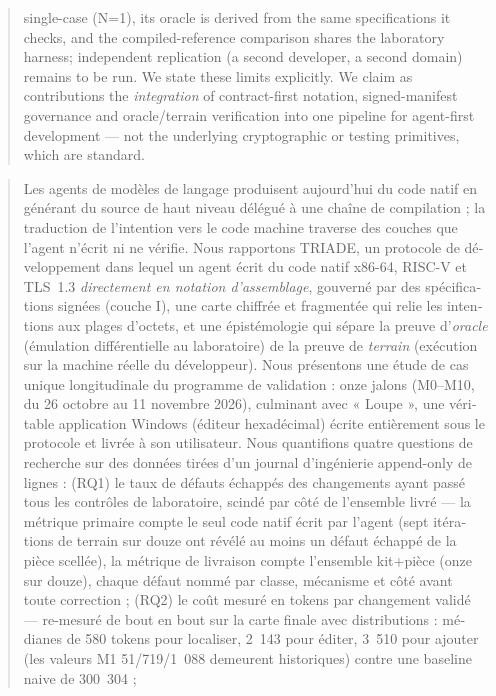 \documentclass[11pt,a4paper]{article}
\begin{document}
\begin{abstract}
single-case (N=1), its oracle is derived from the same specifications it
checks, and the compiled-reference comparison shares the laboratory
harness; independent replication (a second developer, a second domain)
remains to be run. We state these limits explicitly. We claim as contributions the \emph{integration}
of contract-first notation, signed-manifest governance and oracle/terrain
verification into one pipeline for agent-first development --- not the
underlying cryptographic or testing primitives, which are standard.
\end{abstract}

\begin{otherlanguage}{french}
\begin{abstract}
\noindent Les agents de modèles de langage produisent aujourd'hui du code
natif en générant du source de haut niveau délégué à une chaîne de
compilation ; la traduction de l'intention vers le code machine traverse
des couches que l'agent n'écrit ni ne vérifie. Nous rapportons TRIADE, un
protocole de développement dans lequel un agent écrit du code natif
x86-64, RISC-V et TLS~1.3 \emph{directement en notation d'assemblage},
gouverné par des spécifications signées (couche I), une carte chiffrée et
fragmentée qui relie les intentions aux plages d'octets, et une
épistémologie qui sépare la preuve d'\emph{oracle} (émulation
différentielle au laboratoire) de la preuve de \emph{terrain} (exécution
sur la machine réelle du développeur). Nous présentons une étude de cas
unique longitudinale du programme de validation : onze jalons (M0--M10, du
26 octobre au 11 novembre 2026), culminant avec « Loupe », une véritable
application Windows (éditeur hexadécimal) écrite entièrement sous le
protocole et livrée à son utilisateur. Nous quantifions quatre questions
de recherche sur des données tirées d'un journal d'ingénierie append-only
de \nbLignesJournal{} lignes : (RQ1) le taux de défauts échappés des changements ayant
passé tous les contrôles de laboratoire, scindé par côté de l'ensemble
livré — la métrique primaire compte le seul code natif écrit par
l'agent (sept itérations de terrain sur douze ont révélé au moins un
défaut échappé de la pièce scellée), la métrique de livraison compte
l'ensemble kit+pièce (onze sur douze), chaque défaut nommé par classe,
mécanisme et côté avant toute correction ; (RQ2) le coût mesuré en tokens par
changement validé — re-mesuré de bout en bout sur la carte finale avec distributions : médianes de 580 tokens pour localiser, 2~143 pour éditer, 3~510 pour ajouter (les valeurs M1 51/719/1~088 demeurent historiques) contre une baseline naive de 300~304 ;

\end{abstract}
\end{otherlanguage}
\end{document}
